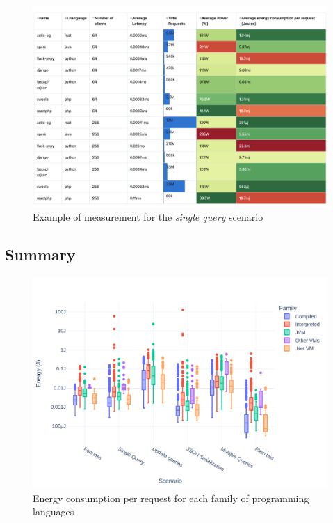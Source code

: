 \begin{figure}[!h]
    \centering
    \includegraphics[width=\textwidth,height=\textheight,keepaspectratio]{example/thesis_exp_raw_table}
    \caption{Example of measurement for the \emph{single query} scenario}
    \label{fig:raw_table_example}
\end{figure}


\subsection{Summary}
\begin{figure}[!h]
    \centering
    \includegraphics[width=.9\columnwidth ]{imgs/all_boxplot}
    \caption{Energy consumption per request for each family of programming languages}
    \label{fig:all_boxplot}
\end{figure}

